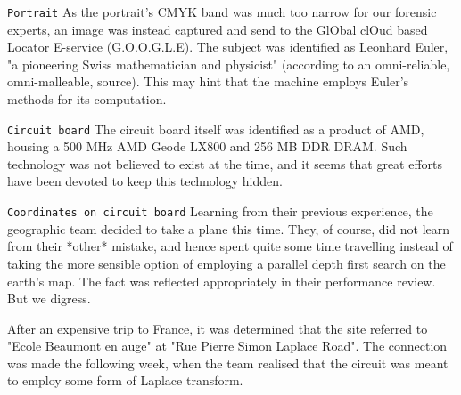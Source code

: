 \texttt{Portrait}
As the portrait's CMYK band was much too narrow for our forensic experts, an image was instead captured and send to the GlObal clOud based Locator E-service (G.O.O.G.L.E). The subject was identified as Leonhard Euler, "a pioneering Swiss mathematician and physicist" (according to an omni-reliable, omni-malleable, source). This may hint that the machine employs Euler's methods for its computation.



\texttt{Circuit board}
The circuit board itself was identified as a product of AMD, housing a 500 MHz AMD Geode LX800 and 256 MB DDR DRAM. Such technology was not believed to exist at the time, and it seems that great efforts have been devoted to keep this technology hidden.


\texttt{Coordinates on circuit board}
Learning from their previous experience, the geographic team decided to take a plane this time. They, of course, did not learn from their *other* mistake, and hence spent quite some time travelling instead of taking the more sensible option of employing a parallel depth first search on the earth's map. The fact was reflected appropriately in their performance review. But we digress.


After an expensive trip to France, it was determined that the site referred to "Ecole Beaumont en auge" at "Rue Pierre Simon Laplace Road". The connection was made the following week, when the team realised that the circuit was meant to employ some form of Laplace transform.
